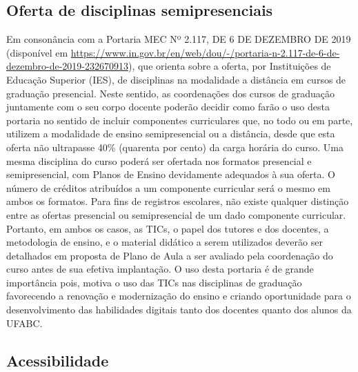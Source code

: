 \documentclass{article}
\begin{document}
\subsection{Oferta de disciplinas semipresenciais}

Em consonância com a Portaria MEC Nº 2.117, DE 6 DE DEZEMBRO DE 2019 (disponível em \url{https://www.in.gov.br/en/web/dou/-/portaria-n-2.117-de-6-de-dezembro-de-2019-232670913}), que orienta sobre a oferta, por Instituições de Educação Superior (IES), de disciplinas na modalidade a distância em cursos de graduação presencial. Neste sentido, as coordenações dos cursos de graduação juntamente com o seu corpo docente poderão decidir como farão o uso desta portaria no sentido de incluir componentes curriculares que, no todo ou em parte, utilizem a modalidade de ensino semipresencial ou a distância, desde que esta oferta não ultrapasse 40\% (quarenta por cento) da carga horária do curso. Uma mesma disciplina do curso poderá ser ofertada nos formatos presencial e semipresencial, com Planos de Ensino devidamente adequados à sua oferta. O número de créditos atribuídos a um componente curricular será o mesmo em ambos os formatos. Para fins de registros escolares, não existe qualquer distinção entre as ofertas presencial ou semipresencial de um dado componente curricular. Portanto, em ambos os casos, as TICs, o papel dos tutores e dos docentes, a metodologia de ensino, e o material didático a serem utilizados deverão ser detalhados em proposta de Plano de Aula a ser avaliado pela coordenação do curso antes de sua efetiva implantação. O uso desta portaria é de grande importância pois, motiva o uso das TICs nas disciplinas de graduação favorecendo a renovação e modernização do ensino e criando oportunidade para o desenvolvimento das habilidades digitais tanto dos docentes quanto dos alunos da UFABC.

\subsection{Acessibilidade}
\end{document}
